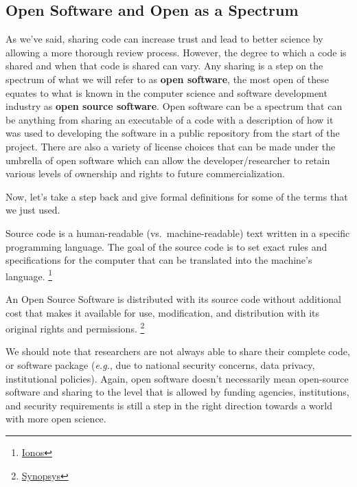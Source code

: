 \documentclass[
  letterpaper,
  DIV=11,
  numbers=noendperiod]{scrreport}
\providecommand{\tightlist}{%
  \setlength{\itemsep}{0pt}\setlength{\parskip}{0pt}}\usepackage{longtable,booktabs,array}
\begin{document}
\hypertarget{open-software-and-open-as-a-spectrum}{%
\subsection{Open Software and Open as a
Spectrum}\label{open-software-and-open-as-a-spectrum}}

As we've said, sharing code can increase trust and lead to better
science by allowing a more thorough review process. However, the degree
to which a code is shared and when that code is shared can vary. Any
sharing is a step on the spectrum of what we will refer to as
\textbf{open software}, the most open of these equates to what is known
in the computer science and software development industry as
\textbf{open source software}. Open software can be a spectrum that can
be anything from sharing an executable of a code with a description of
how it was used to developing the software in a public repository from
the start of the project. There are also a variety of license choices
that can be made under the umbrella of open software which can allow the
developer/researcher to retain various levels of ownership and rights to
future commercialization.

Now, let's take a step back and give formal definitions for some of the
terms that we just used.

\begin{description}
\tightlist
\item[Source Code]
Source code is a human-readable (vs.~machine-readable) text written in a
specific programming language. The goal of the source code is to set
exact rules and specifications for the computer that can be translated
into the machine's language. \footnote{\href{https://www.ionos.com/digitalguide/websites/web-development/source-code-explained-definition-examples/}{Ionos}}
\item[Open Source Software (OSS)]
An Open Source Software is distributed with its source code without
additional cost that makes it available for use, modification, and
distribution with its original rights and permissions. \footnote{\href{https://www.synopsys.com/glossary/what-is-open-source-software.html}{Synopsys}}
\end{description}

We should note that researchers are not always able to share their
complete code, or software package (\emph{e.g.}, due to national
security concerns, data privacy, institutional policies). Again, open
software doesn't necessarily mean open-source software and sharing to
the level that is allowed by funding agencies, institutions, and
security requirements is still a step in the right direction towards a
world with more open science.
\end{document}

